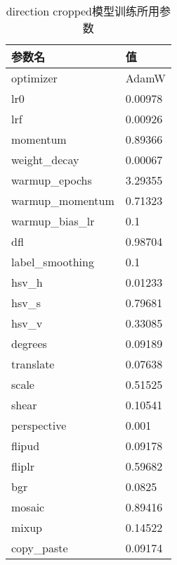     \begin{table}
      \centering
    \begin{tabular}{ll}\toprule
       参数名&值\\\midrule
       optimizer&AdamW\\
       lr0&0.00978\\
       lrf&0.00926\\
       momentum&0.89366\\
       weight\_decay&0.00067\\
       warmup\_epochs&3.29355\\
       warmup\_momentum&0.71323\\
       warmup\_bias\_lr&0.1\\


       dfl&0.98704\\

     
       label\_smoothing&0.1\\
     
       hsv\_h&0.01233\\
       hsv\_s&0.79681\\
       hsv\_v&0.33085\\
       degrees&0.09189\\
       translate&0.07638\\
       scale&0.51525\\
       shear&0.10541\\
       perspective&0.001\\
       flipud&0.09178\\
       fliplr&0.59682\\
       bgr&0.0825\\
       mosaic&0.89416\\
       mixup&0.14522\\
       copy\_paste&0.09174\\
       \bottomrule
      \end{tabular}
      \caption{direction cropped模型训练所用参数}
      \end{table}
   

